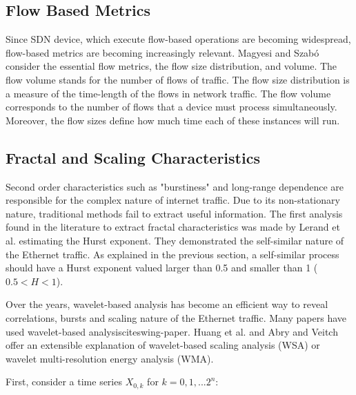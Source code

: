 \subsection{Flow Based Metrics}


Since SDN device, which execute flow-based operations are becoming widespread, flow-based metrics are becoming increasingly relevant\cite{validate-trafficgen}\cite{sdn-survey}. Magyesi and Szabó\cite{validate-trafficgen} consider the essential flow metrics, the flow size distribution, and volume. The flow volume stands for the number of flows of traffic. The flow size distribution is a measure of the time-length of the flows in network traffic. The flow volume corresponds to the number of flows that a device must process simultaneously. Moreover, the flow sizes define how much time each of these instances will run.


\subsection{Fractal and Scaling Characteristics}

Second order characteristics such as "burstiness" and long-range dependence are responsible for the complex nature of internet traffic\cite{validate-trafficgen}. Due to its non-stationary nature, traditional methods fail to extract useful information\cite{validate-trafficgen}. The first analysis found in the literature to extract fractal characteristics was made by Lerand et al. estimating the  Hurst exponent\cite{selfsimilar-ethernet}. They demonstrated the self-similar nature of the Ethernet traffic. As explained in the previous section, a self-similar process should have a Hurst exponent valued larger than 0.5 and smaller than 1 ($0.5 < H < 1$).

Over the years, wavelet-based analysis has become an efficient way to reveal correlations, bursts and scaling nature of the Ethernet traffic\cite{validate-trafficgen}. Many papers have used wavelet-based analysiscite{swing-paper}\cite{non-intrusive-wavelet}\cite{wavelet-analysis-long-range}. Huang et al.\cite{non-intrusive-wavelet} and Abry and Veitch\cite{wavelet-analysis-long-range} offer an extensible explanation of wavelet-based scaling analysis (\acrshort{WSA}) or wavelet multi-resolution energy analysis (\acrshort{WMA}).  

First, consider a time series $X_{0,k}$ for $k = 0, 1, ... 2^n$:

